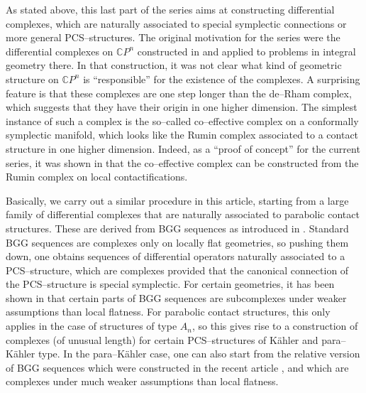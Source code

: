 \documentclass[12pt,a4paper]{amsart}
\def\Bbb{\mathbb}
\numberwithin{theorem}{section}
\theoremstyle{definition}
\theoremstyle{remark}
\begin{document}
\smallskip

As stated above, this last part of the series aims at constructing
differential complexes, which are naturally associated to special
symplectic connections or more general PCS--structures. The original
motivation for the series were the differential complexes on $\Bbb
CP^n$ constructed in \cite{E-G} and applied to problems in integral
geometry there. In that construction, it was not clear what kind of 
geometric structure on $\Bbb CP^n$ is ``responsible'' for the
existence of the complexes. A surprising feature is that these
complexes are one step longer than the de--Rham complex, which
suggests that they have their origin in one higher dimension. The
simplest instance of such a complex is the so--called co--effective
complex on a conformally symplectic manifold, which looks like the
Rumin complex associated to a contact structure in one higher
dimension. Indeed, as a ``proof of concept'' for the current series,
it was shown in \cite{Cap-Salac} that the co--effective complex can be
constructed from the Rumin complex on local contactifications. 

Basically, we carry out a similar procedure in this article, starting
from a large family of differential complexes that are naturally
associated to parabolic contact structures. These are derived from
BGG sequences as introduced in \cite{CSS-BGG}. Standard BGG sequences
are complexes only on locally flat geometries, so pushing them down,
one obtains sequences of differential operators naturally associated
to a PCS--structure, which are complexes provided that the canonical
connection of the PCS--structure is special symplectic. For certain
geometries, it has been shown in \cite{subcomplexes} that certain
parts of BGG sequences are subcomplexes under weaker assumptions than
local flatness. For parabolic contact structures, this only applies in
the case of structures of type $A_n$, so this gives rise to a
construction of complexes (of unusual length) for certain
PCS--structures of K\"ahler and para--K\"ahler type. In the
para--K\"ahler case, one can also start from the relative version of
BGG sequences which were constructed in the recent article
\cite{Rel-BGG2}, and which are complexes under much weaker assumptions
than local flatness.
\end{document}
